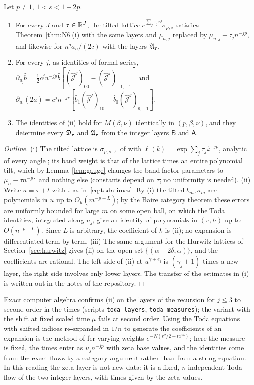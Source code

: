 \begin{theorem}\label{thm:toda}
Let $p\ne1$, $1<s<1+2p$.
\begin{enumerate}
\item[(i)] For every $J$ and $\tau\in\mathbb{R}^J$, the tilted lattice $e^{\sum_j\tau_jx^j}\sigma_{p,s}$ satisfies Theorem~\ref{thm:N6}(i) with the same
layers and $\mu_{n,j}$ replaced by $\mu_{n,j}-\tau_jn^{-jp}$, and likewise for $n^pa_n/(2c)$ with the layers $\mathfrak A_{\mathbf r}$.
\item[(ii)] For every $j$, as identities of formal series,
$\partial_{u_j}\hat b=\tfrac12c^jn^{-jp}\hat b[(\hat{\mathcal J}^j)_{00}-(\hat{\mathcal J}^j)_{-1,-1}]$ and
$\partial_{u_j}(2\hat a)=c^jn^{-jp}[\hat b_1(\hat{\mathcal J}^j)_{10}-\hat b_0(\hat{\mathcal J}^j)_{0,-1}]$.
\item[(iii)] The identities of (ii) hold for $M(\beta,\nu)$ identically in $(p,\beta,\nu)$, and they determine every $\mathfrak D_{\mathbf r}$ and $\mathfrak A_{\mathbf r}$ from
the integer layers $\mathsf B$ and $\mathsf A$.
\end{enumerate}
\end{theorem}

\begin{proof}[Outline]
(i) The tilted lattice is $\sigma_{p,s,\ell}$ of \cite{PaperII} with $\ell(k)=\exp\sum_j\tau_jk^{-jp}$, analytic of every angle
\cite[Definition~1.1]{PaperII}; its band weight is that of the lattice times an entire polynomial tilt, which by Lemma~\ref{lem:gauge} changes
the band-factor parameters to $\mu_n-\tau n^{-p\cdot}$ and nothing else (constants depend on $\tau$; no uniformity is needed). (ii) Write
$u=\tau+t$ with $t$ as in~\eqref{eq:todatimes}. By (i) the tilted $b_m,a_m$ are polynomials in $u$ up to $O_u(m^{-p-L})$; by the Baire category
theorem these errors are uniformly bounded for large $m$ on some open ball, on which the Toda identities, integrated along $u_j$, give an identity
of polynomials in $(u,h)$ up to $O(n^{-p-L})$. Since $L$ is arbitrary, the coefficient of $h$ is (ii); no expansion is differentiated term by
term. (iii) The same argument for the Hurwitz lattices of Section~\ref{sec:hurwitz} gives (ii) on the open set $\{(\alpha+2\delta,\alpha)\}$, and the
coefficients are rational. The left side of (ii) at $u^{\gamma+e_j}$ is $(\gamma_j+1)$ times a new layer, the right side involves only lower
layers. The transfer of the estimates in (i) is written out in the notes of the repository.
\end{proof}

Exact computer algebra confirms (ii) on the layers of the recursion for $j\le3$ to second order in the times (scripts \texttt{toda\_layers},
\texttt{toda\_measures}); the variant with the shift at fixed scaled time $\mu$ fails at second order. Using the Toda equations with shifted
indices re-expanded in $1/n$ to generate the coefficients of an expansion is the method of \cite[Section~4]{EMP} for varying weights
$e^{-N(x^2/2+tx^{2\nu})}$; here the measure is fixed, the times enter as $u_jn^{-jp}$ with zeta base values, and the identities come from the
exact flows by a category argument rather than from a string equation. In this reading the zeta layer is not new data: it is a fixed,
$n$-independent Toda flow of the two integer layers, with times given by the zeta values.

